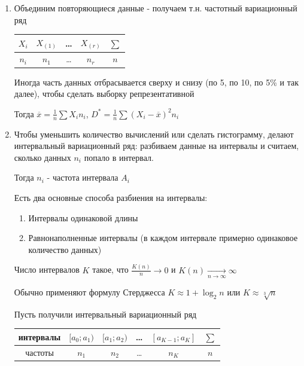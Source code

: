 \begin{enumerate}
\begin{enumerate}
        \item Объединим повторяющиеся данные - получаем т.н. частотный вариационный ряд

        \begin{tabular}{c|c|c|c|c}
            $X_i$ & $X_{(1)}$ & \dots & $X_{(r)}$ & $\sum$ \\ 
            \hline
            $n_i$ & $n_1$ & \dots & $n_r$ & $n$ \\ 
        \end{tabular}

        Иногда часть данных отбрасывается сверху и снизу (по 5, по 10, по 5\% и так далее), чтобы сделать выборку репрезентативной

        Тогда $\overline{x} = \frac{1}{n} \sum X_i n_i$, $D^* = \frac{1}{n} \sum (X_i - \overline{x})^2 n_i$
        
        \item Чтобы уменьшить количество вычислений или сделать гистограмму, делают интервальный вариационный ряд: 
        разбиваем данные на интервалы и считаем, сколько данных $n_i$ попало в интервал. 

        Тогда $n_i$ - частота интервала $A_i$

        Есть два основные способа разбиения на интервалы: 

        \begin{enumerate}
            \item Интервалы одинаковой длины
            \item Равнонаполненные интервалы (в каждом интервале примерно одинаковое количество данных)
        \end{enumerate}

        Число интервалов $K$ такое, что $\frac{K(n)}{n} \longrightarrow 0$ и $K(n) \underset{n \to \infty}{\longrightarrow} \infty$

        Обычно применяют формулу Стерджесса $K \approx 1 + \log_2 n$ или $K \approx \sqrt[3]{n}$

        Пусть получили интервальный вариационный ряд

        \begin{tabular}{c|c|c|c|c|c}
            интервалы & $[a_0; a_1)$ & $[a_1; a_2)$ & \dots & $[a_{K - 1}; a_K]$ & $\sum$ \\ 
            \hline
            частоты & $n_1$ & $n_2$ & \dots & $n_K$ & $n$ \\ 
        \end{tabular}
    \end{enumerate}


\end{enumerate}
